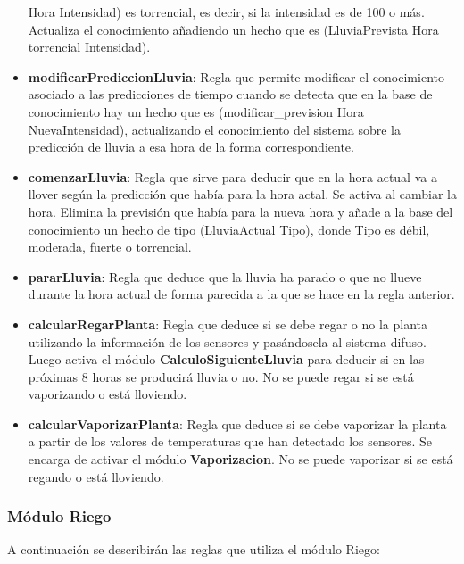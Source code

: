 \documentclass[11pt,a4paper]{article}
\begin{document}
\begin{itemize}
	Hora Intensidad) es torrencial, es decir, si la intensidad es de 100 o más. Actualiza el conocimiento añadiendo un
	hecho que es (LluviaPrevista Hora torrencial Intensidad).
	\item \textbf{modificarPrediccionLluvia}: Regla que permite modificar el conocimiento asociado a las predicciones de tiempo
	cuando se detecta que en la base de conocimiento hay un hecho que es (modificar\_prevision Hora NuevaIntensidad), actualizando
	el conocimiento del sistema sobre la predicción de lluvia a esa hora de la forma correspondiente.
	\item \textbf{comenzarLluvia}: Regla que sirve para deducir que en la hora actual va a llover según la predicción que había para
	la hora actal. Se activa al cambiar la hora. Elimina la previsión que había para la nueva hora y añade a la base del conocimiento
	un hecho de tipo (LluviaActual Tipo), donde Tipo es débil, moderada, fuerte o torrencial.
	\item \textbf{pararLluvia}: Regla que deduce que la lluvia ha parado o que no llueve durante la hora actual de forma parecida
	a la que se hace en la regla anterior.
	\item \textbf{calcularRegarPlanta}: Regla que deduce si se debe regar o no la planta utilizando la información de los sensores
	y pasándosela al sistema difuso. Luego activa el módulo \textbf{CalculoSiguienteLluvia} para deducir si en las próximas 8
	horas se producirá lluvia o no. No se puede regar si se está vaporizando o está lloviendo.
	\item \textbf{calcularVaporizarPlanta}: Regla que deduce si se debe vaporizar la planta a partir de los valores de temperaturas
	que han detectado los sensores. Se encarga de activar el módulo \textbf{Vaporizacion}. No se puede vaporizar si se está regando
	o está lloviendo.
\end{itemize}

\subsubsection{Módulo Riego}

A continuación se describirán las reglas que utiliza el módulo Riego:
\end{document}
